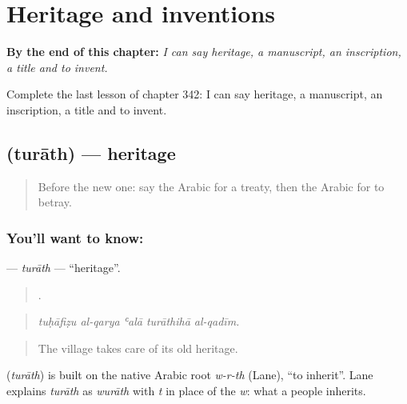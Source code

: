 
\chapter{Heritage and inventions}
\label{ch:ar-heritage-and-inventions}

\begin{chapteropening}
\textbf{By the end of this chapter:} \emph{I can say heritage, a manuscript, an inscription, a title and to invent.}

Complete the last lesson of chapter 342: I can say heritage, a manuscript, an inscription, a title and to invent.
\end{chapteropening}

\section[\texorpdfstring{\ar{تراث} (turāth)}{تراث (turāth)}]{ (turāth) — heritage}

\label{lesson:AR-C342-turath}



\begin{quote}
Before the new one: say the Arabic for a treaty, then the Arabic for to betray.
\end{quote}

\subsection*{You'll want to know: }
\textbf{} — \emph{turāth} — \textquotedblleft{}heritage\textquotedblright{}.

\begin{quote}
    .
\end{quote}

\begin{quote}
\emph{tuḥāfiẓu al-qarya ʿalā turāthihā al-qadīm.}
\end{quote}

\begin{quote}
The village takes care of its old heritage.
\end{quote}

\begin{cousinweb}
\textbf{} (\emph{turāth}) is built on the native Arabic root \emph{w-r-th} (Lane), \textquotedblleft{}to inherit\textquotedblright{}. Lane explains \emph{turāth} as \emph{wurāth} with \emph{t} in place of the \emph{w}: what a people inherits.
\end{cousinweb}

